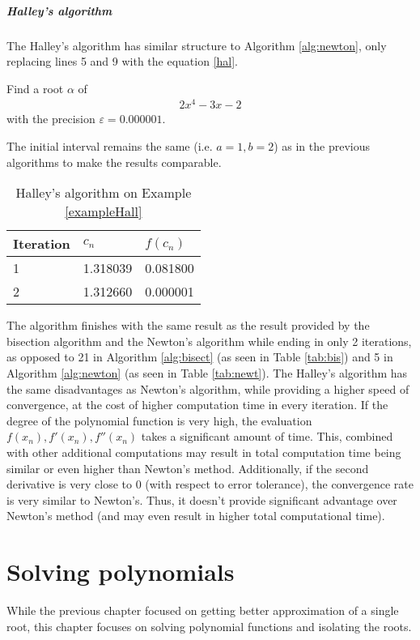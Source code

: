 \documentclass[
  digital, %
  notable,   %
  nolof,     %
  nolot,     %
	final, %
]{fithesis3}
\begin{document}
\paragraph{Halley's algorithm}
The Halley's algorithm has similar structure to Algorithm \ref{alg:newton}, only replacing lines 5 and 9 with the equation \ref{hal}.
\begin{example}
\label{exampleHall}
Find a root $\alpha$ of 
\begin{align}
      2x^{4} - 3x - 2
\end{align}
with the precision $\varepsilon = 0.000001$.
\end{example}
The initial interval remains the same (i.e. $a=1, b=2$) as in the previous algorithms to make the results comparable.
\FloatBarrier
\begin{table}[H]
  \begin{tabular*}{\textwidth}{lll}
    \toprule
    Iteration & $c_{n}$ & $f(c_{n})$\\
    \midrule
				1 & 1.318039 & 0.081800 \\
				2 & 1.312660 & 0.000001 \\
    \bottomrule
  \end{tabular*}
  \caption{Halley's algorithm on Example \ref{exampleHall}}
  \label{tab:hall}
\end{table}
The algorithm finishes with the same result as the result provided by the bisection algorithm and the Newton's algorithm while ending in only 2 iterations, as opposed to 21 in Algorithm \ref{alg:bisect} (as seen in Table \ref{tab:bis}) and 5 in Algorithm \ref{alg:newton} (as seen in Table \ref{tab:newt}).
The Halley's algorithm has the same disadvantages as Newton's algorithm, while providing a higher speed of convergence, at the cost of higher computation time in every iteration. If the degree of the polynomial function is very high, the evaluation $f(x_{n}), f'(x_{n}), f''(x_{n})$ takes a significant amount of time. This, combined with other additional computations may result in total computation time being similar or even higher than Newton's method. Additionally, if the second derivative is very close to 0 (with respect to error tolerance), the convergence rate is very similar to Newton's. Thus, it doesn't provide significant advantage over Newton's method (and may even result in higher total computational time).

\chapter{Solving polynomials}
While the previous chapter focused on getting better approximation of a single root, this chapter focuses on solving polynomial functions and isolating the roots.
\end{document}
